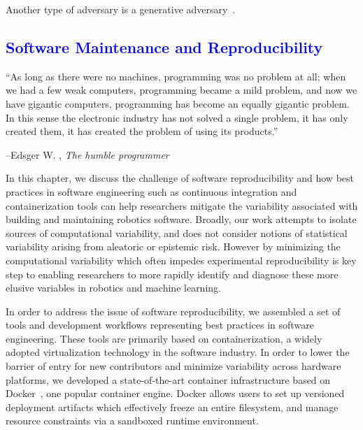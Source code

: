\documentclass[12pt,initial,twoside,maitrise]{dms}
\newcommand{\mediumwell}[1]{\textcolor{blue}{#1}}
\numberwithin{equation}{section}
\numberwithin{table}{chapter}
\numberwithin{figure}{chapter}
\begin{document}
Another type of adversary is a generative adversary~\citep{pmlr-v97-albuquerque19a}.




\mediumwell{\chapter{Software Maintenance and Reproducibility}\label{ch:ducker}}

\setlength{\epigraphwidth}{0.80\textwidth}
\epigraph{``As long as there were no machines, programming was no problem at all; when we had a few weak computers, programming became a mild problem, and now we have gigantic computers, programming has become an equally gigantic problem. In this sense the electronic industry has not solved a single problem, it has only created them, it has created the problem of using its products.''}{\begin{flushright}--Edsger W. \citet{dijkstra1972humble}, \textit{The humble programmer}\end{flushright}}

In this chapter, we discuss the challenge of software reproducibility and how best practices in software engineering such as continuous integration and containerization tools can help researchers mitigate the variability associated with building and maintaining robotics software. Broadly, our work attempts to isolate sources of computational variability, and does not consider notions of statistical variability arising from aleatoric or epistemic risk. However by minimizing the computational variability which often impedes experimental reproducibility is key step to enabling researchers to more rapidly identify and diagnose these more elusive variables in robotics and machine learning.

In order to address the issue of software reproducibility, we assembled a set of tools and development workflows representing best practices in software engineering. These tools are primarily based on containerization, a widely adopted virtualization technology in the software industry. In order to lower the barrier of entry for new contributors and minimize variability across hardware platforms, we developed a state-of-the-art container infrastructure based on Docker~\citep{merkel2014docker}, one popular container engine. Docker allows users to set up versioned deployment artifacts which effectively freeze an entire filesystem, and manage resource constraints via a sandboxed runtime environment.
\end{document}
